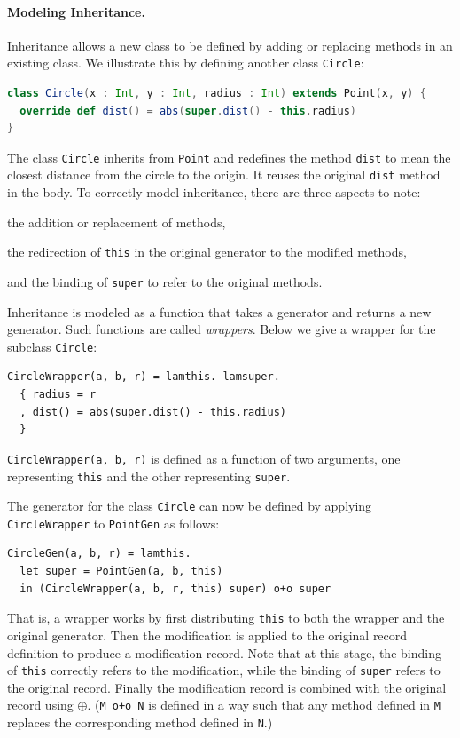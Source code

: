 \paragraph{Modeling Inheritance.}

Inheritance allows a new class to be defined by adding or replacing methods in
an existing class. We illustrate this by defining another class \lstinline{Circle}:
\begin{lstlisting}[language=Scala]
class Circle(x : Int, y : Int, radius : Int) extends Point(x, y) {
  override def dist() = abs(super.dist() - this.radius)
}
\end{lstlisting}
The class \lstinline{Circle} inherits from \lstinline{Point} and redefines the
method \lstinline{dist} to mean the closest distance from the circle to the
origin. It reuses the original \lstinline{dist} method in the body.
To correctly model inheritance, there are three aspects to note:
\begin{inparaenum}[(1)]
\item the addition or replacement of methods,
\item the redirection of \lstinline{this} in the original generator to the modified methods,
\item and the binding of \lstinline{super} to refer to the original methods.
\end{inparaenum}

Inheritance is modeled as a function that takes a generator and returns a new
generator. Such functions are called \textit{wrappers}. Below we give a wrapper
for the subclass \lstinline{Circle}:
\begin{lstlisting}[language=simple]
CircleWrapper(a, b, r) = lamthis. lamsuper.
  { radius = r
  , dist() = abs(super.dist() - this.radius)
  }
\end{lstlisting}
\lstinline{CircleWrapper(a, b, r)} is defined as a function of two arguments,
one representing \lstinline{this} and the other representing \lstinline{super}.

The generator for the class \lstinline{Circle} can now be defined by
applying \lstinline{CircleWrapper} to \lstinline{PointGen} as follows:
\begin{lstlisting}[language=simple]
CircleGen(a, b, r) = lamthis.
  let super = PointGen(a, b, this)
  in (CircleWrapper(a, b, r, this) super) o+o super
\end{lstlisting}
That is, a wrapper works by first distributing \lstinline{this} to both the
wrapper and the original generator. Then the modification is applied to the
original record definition to produce a modification record. Note that at this
stage, the binding of \lstinline{this} correctly refers to the modification,
while the binding of \lstinline{super} refers to the original record. Finally
the modification record is combined with the original record using $\oplus$.
(\lstinline{M o+o N} is defined in a way such that any method defined in \lstinline{M}
replaces the corresponding method defined in \lstinline{N}.)


